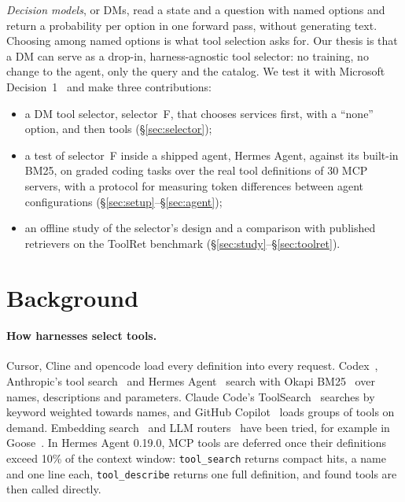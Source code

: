 \documentclass[11pt]{article}
\newcommand{\msd}{Microsoft Decision~1}
\newcommand{\F}{selector~F}
\begin{document}
\emph{Decision models}, or DMs, read a state and a question with named options and return a probability per option in
one forward pass, without generating text. Choosing among named options is what tool selection asks for. Our thesis is
that a DM can serve as a drop-in, harness-agnostic tool selector: no training, no change to the agent, only the query
and the catalog. We test it with \msd{}~\citep{msd1} and make three contributions:
\begin{itemize}
\item a DM tool selector, \F{}, that chooses services first, with a ``none'' option, and then tools
(\S\ref{sec:selector});
\item a test of \F{} inside a shipped agent, Hermes Agent, against its built-in BM25, on graded coding tasks over the
real tool definitions of 30 MCP servers, with a protocol for measuring token differences between agent
configurations (\S\ref{sec:setup}--\S\ref{sec:agent});
\item an offline study of the selector's design and a comparison with published retrievers on the ToolRet benchmark
(\S\ref{sec:study}--\S\ref{sec:toolret}).
\end{itemize}

\section{Background}\label{sec:background}
\paragraph{How harnesses select tools.} Cursor, Cline and opencode load every definition into every request.
Codex~\citep{codexcli}, Anthropic's tool search~\citep{anthropic2025toolsearch} and Hermes Agent~\citep{hermesagent}
search with Okapi BM25~\citep{robertson2009bm25} over names, descriptions and parameters. Claude Code's
ToolSearch~\citep{claudecode} searches by keyword weighted towards names, and GitHub
Copilot~\citep{copilotvirtualtools} loads groups of tools on demand. Embedding search~\citep{gan2025ragmcp} and LLM
routers~\citep{du2024anytool} have been tried, for example in Goose~\citep{goose}. In Hermes Agent 0.19.0, MCP tools
are deferred once their definitions exceed 10\% of the context window: \texttt{tool\_search} returns compact hits, a
name and one line each, \texttt{tool\_describe} returns one full definition, and found tools are then called directly.
\end{document}
